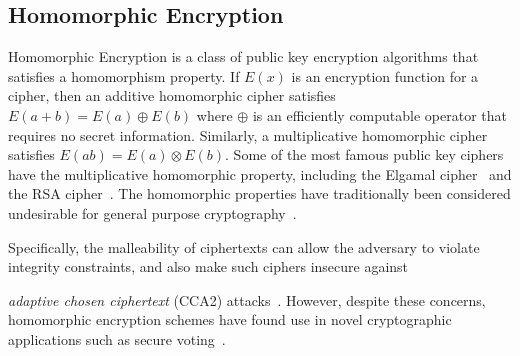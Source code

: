 \subsection{Homomorphic Encryption}
\label{sec:homomorphic-encryption}
Homomorphic Encryption is a class of public key encryption algorithms
that satisfies a homomorphism property. If $E(x)$ is an encryption
function for a cipher, then an additive homomorphic cipher satisfies
$E(a+b)=E(a)\oplus E(b)$ where $\oplus$ is an efficiently computable
operator that requires no secret information. Similarly, a multiplicative
homomorphic cipher satisfies $E(ab)=E(a)\otimes E(b)$. Some of the
most famous public key ciphers have the multiplicative homomorphic
property, including the Elgamal cipher~\cite{elgamal85} and the RSA
cipher~\cite{rivest83rsa}. The homomorphic properties have traditionally
been considered undesirable for general purpose cryptography~\cite{jmsw02}.
%
\begin{comment}
mention Cramer-Shoup? 
\end{comment}
{}Specifically, the malleability of ciphertexts can allow the adversary
to violate integrity constraints, and also make such ciphers insecure
against %
\begin{comment}
because the homomorphic structure aids in cryptanalysis and allows
encrypted messages to be modified, violating integrity 
constraints~\cite{jmsw02}. This leads to insecurity against 
\end{comment}
{}\emph{adaptive chosen ciphertext} (CCA2) attacks~\cite{bleichenbacher98chosen}.
However, despite these concerns, homomorphic encryption schemes have
found use in novel cryptographic applications such as secure
voting~\cite{benaloh94}. 

